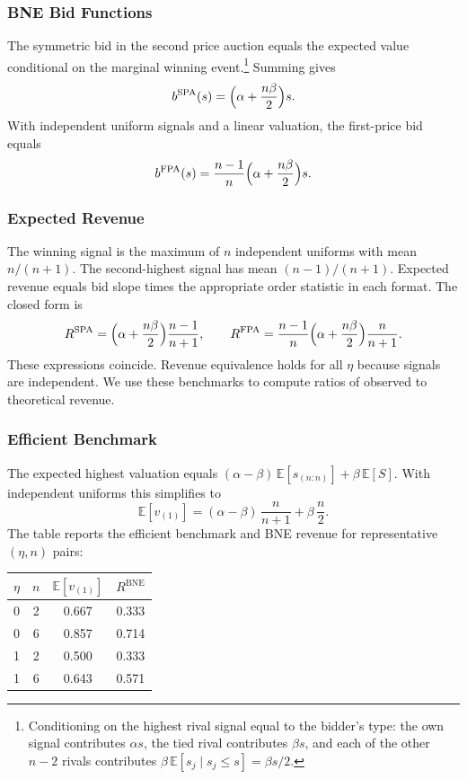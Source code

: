 \subsubsection{BNE Bid Functions}

The symmetric bid in the second price auction equals the expected value conditional on the marginal winning event.\footnote{Conditioning on the highest rival signal equal to the bidder’s type: the own signal contributes $\alpha s$, the tied rival contributes $\beta s$, and each of the other $n-2$ rivals contributes $\beta\,\mathbb{E}[s_j\mid s_j\le s]=\beta s/2$.} Summing gives
\[
b^{\text{SPA}}(s) = \Bigl(\alpha + \frac{n\beta}{2}\Bigr) s.
\]
With independent uniform signals and a linear valuation, the first-price bid equals
\[
b^{\text{FPA}}(s) = \frac{n-1}{n} \Bigl(\alpha + \frac{n\beta}{2}\Bigr) s.
\]

\subsubsection{Expected Revenue}

The winning signal is the maximum of $n$ independent uniforms with mean $n/(n+1)$. The second-highest signal has mean $(n-1)/(n+1)$. Expected revenue equals bid slope times the appropriate order statistic in each format. The closed form is
\[
R^{\text{SPA}} = \Bigl(\alpha + \frac{n\beta}{2}\Bigr) \frac{n-1}{n+1},\qquad
R^{\text{FPA}} = \frac{n-1}{n} \Bigl(\alpha + \frac{n\beta}{2}\Bigr) \frac{n}{n+1}.
\]
These expressions coincide. Revenue equivalence holds for all $\eta$ because signals are independent. We use these benchmarks to compute ratios of observed to theoretical revenue.

\subsubsection{Efficient Benchmark}

The expected highest valuation equals $(\alpha-\beta)\,\mathbb{E}[s_{(n:n)}] + \beta\,\mathbb{E}[S]$. With independent uniforms this simplifies to
\[
\mathbb{E}[v_{(1)}] = (\alpha-\beta)\,\frac{n}{n+1} + \beta\,\frac{n}{2}.
\]
The table reports the efficient benchmark and BNE revenue for representative $(\eta,n)$ pairs:
\begin{table}[H]
  \centering
  \small
  \begin{tabular}{cccc}
    \toprule
    $\eta$ & $n$ & $\mathbb{E}[v_{(1)}]$ & $R^{\text{BNE}}$ \\
    \midrule
    0 & 2 & 0.667 & 0.333 \\
    0 & 6 & 0.857 & 0.714 \\
    1 & 2 & 0.500 & 0.333 \\
    1 & 6 & 0.643 & 0.571 \\
    \bottomrule
  \end{tabular}
\end{table}

